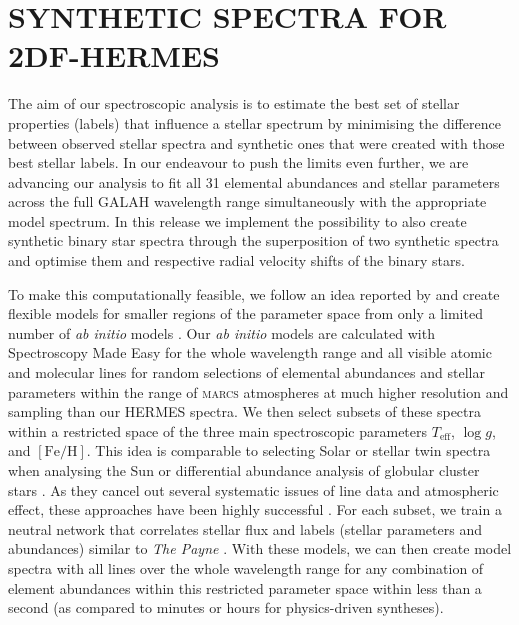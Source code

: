 \documentclass[
  journal=pasa,
  manuscript=research-paper, %
  year=2023,
  volume=37
]{cup-journal}
\newcommand{\Teff}{$T_\mathrm{eff}$\xspace}
\newcommand{\logg}{$\log g$\xspace}
\newcommand{\feh}{$\mathrm{[Fe/H]}$\xspace}
\newcommand{\marcs}{\textsc{marcs}\xspace}
\begin{document}
\section{SYNTHETIC SPECTRA FOR 2DF-HERMES}
\label{sec:synthetic_spectra}

The aim of our spectroscopic analysis is to estimate the best set of stellar properties (labels) that influence a stellar spectrum by minimising the difference between observed stellar spectra and synthetic ones that were created with those best stellar labels. In our endeavour to push the limits even further, we are advancing our analysis to fit all 31 elemental abundances and stellar parameters across the full GALAH wavelength range simultaneously with the appropriate model spectrum. In this release we implement the possibility to also create synthetic binary star spectra through the superposition of two synthetic spectra and optimise them and respective radial velocity shifts of the binary stars.

To make this computationally feasible, we follow an idea reported by \citet{Rix2016} and create flexible models for smaller regions of the parameter space from only a limited number of \textit{ab initio} models \citep[see also][]{Ting2016b}. Our \textit{ab initio} models are calculated with Spectroscopy Made Easy \citep[\textsc{sme}][]{Valenti1996,Piskunov2017} for the whole wavelength range and all visible atomic and molecular lines for random selections of elemental abundances and stellar parameters within the range of \marcs atmospheres \citep{Gustafsson2008} at much higher resolution and sampling than our HERMES spectra. We then select subsets of these spectra within a restricted space of the three main spectroscopic parameters \Teff, \logg, and \feh. This idea is comparable to selecting Solar or stellar twin spectra when analysing the Sun \citep[see e.g.]{Nissen2015} or differential abundance analysis of globular cluster stars \citep[e.g.]{Yong2013, Monty2023}. As they cancel out several systematic issues of line data and atmospheric effect, these approaches have been highly successful \citep{Nissen2018}. For each subset, we train a neutral network that correlates stellar flux and labels (stellar parameters and abundances) similar to \textit{The Payne} \citep{Ting2019}. With these models, we can then create model spectra with all lines over the whole wavelength range for any combination of element abundances within this restricted parameter space within less than a second (as compared to minutes or hours for physics-driven syntheses). 
\end{document}
